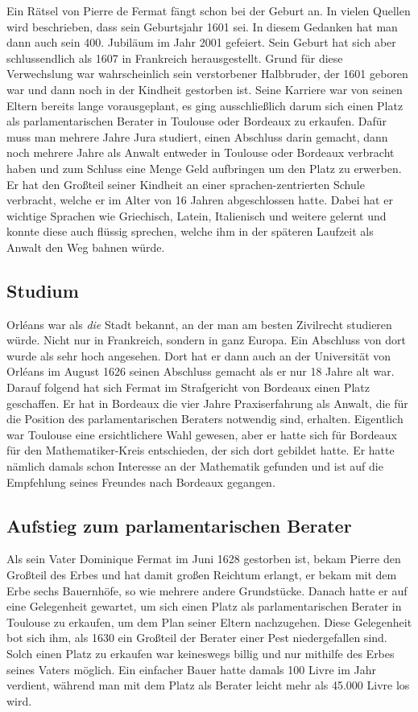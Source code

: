         Ein Rätsel von Pierre de Fermat fängt schon bei der Geburt an. In vielen Quellen wird beschrieben, dass sein Geburtsjahr 1601 sei. In diesem Gedanken hat man dann auch sein 400. Jubiläum im Jahr 2001 gefeiert. Sein Geburt hat sich aber schlussendlich als 1607 in Frankreich herausgestellt. \cite{whenWasFermatBorn} Grund für diese Verwechslung war wahrscheinlich sein verstorbener Halbbruder, der 1601 geboren war und dann noch in der Kindheit gestorben ist. \cite{famousScientistsFermat} Seine Karriere war von seinen Eltern bereits lange vorausgeplant, es ging ausschließlich darum sich einen Platz als parlamentarischen Berater in Toulouse oder Bordeaux zu erkaufen. Dafür muss man mehrere Jahre Jura studiert, einen Abschluss darin gemacht, dann noch mehrere Jahre als Anwalt entweder in Toulouse oder Bordeaux verbracht haben und zum Schluss eine Menge Geld aufbringen um den Platz zu erwerben. Er hat den Großteil seiner Kindheit an einer sprachen-zentrierten Schule verbracht, welche er im Alter von 16 Jahren abgeschlossen hatte. Dabei hat er wichtige Sprachen wie Griechisch, Latein, Italienisch und weitere gelernt und konnte diese auch flüssig sprechen, welche ihm in der späteren Laufzeit als Anwalt den Weg bahnen würde.

    \subsection{Studium} \label{sec:studium}
        Orléans war als \textit{die} Stadt bekannt, an der man am besten Zivilrecht studieren würde. Nicht nur in Frankreich, sondern in ganz Europa. Ein Abschluss von dort wurde als sehr hoch angesehen. Dort hat er dann auch an der Universität von Orléans im August 1626 seinen Abschluss gemacht als er nur 18 Jahre alt war. Darauf folgend hat sich Fermat im Strafgericht von Bordeaux einen Platz geschaffen. Er hat in Bordeaux die vier Jahre Praxiserfahrung als Anwalt, die für die Position des parlamentarischen Beraters notwendig sind, erhalten. Eigentlich war Toulouse eine ersichtlichere Wahl gewesen, aber er hatte sich für Bordeaux für den Mathematiker-Kreis entschieden, der sich dort gebildet hatte. Er hatte nämlich damals schon Interesse an der Mathematik gefunden und ist auf die Empfehlung seines Freundes nach Bordeaux gegangen.

    \subsection{Aufstieg zum parlamentarischen Berater} \label{sec:aufstieg}
        Als sein Vater Dominique Fermat im Juni 1628 gestorben ist, bekam Pierre den Großteil des Erbes und hat damit großen Reichtum erlangt, er bekam mit dem Erbe sechs Bauernhöfe, so wie mehrere andere Grundstücke. Danach hatte er auf eine Gelegenheit gewartet, um sich einen Platz als parlamentarischen Berater in Toulouse zu erkaufen, um dem Plan seiner Eltern nachzugehen. Diese Gelegenheit bot sich ihm, als 1630 ein Großteil der Berater einer Pest niedergefallen sind. Solch einen Platz zu erkaufen war keineswegs billig und nur mithilfe des Erbes seines Vaters möglich. Ein einfacher Bauer hatte damals 100 Livre im Jahr verdient, während man mit dem Platz als Berater leicht mehr als 45.000 Livre los wird.

